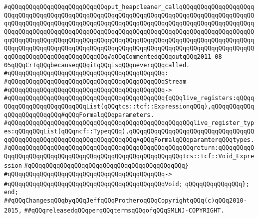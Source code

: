 \verb|#qQQqqQQqqQQqqQQqqQQqqQQqqQQqput_heapcleaner_callqQQqqQQqqQQqqQQqqQQqqQQqqQQqqQQqqQQqqQQqqQQqqQQqqQQqqQQqqQQqqQQqqQQqqQQqqQQqqQQqqQQqqQQqqQQqqQQqqQQqqQQqqQQqqQQqqQQqqQQqqQQqqQQqqQQqqQQqqQQqqQQqqQQqqQQqqQQqqQQqqQQqqQQqqQQqqQQqqQQqqQQqqQQqqQQqqQQqqQQqqQQqqQQqqQQqqQQqqQQqqQQqqQQqqQQqqQQqqQQqqQQqqQQqqQQqqQQqqQQqqQQqqQQqqQQqqQQqqQQqqQQqqQQqqQQqqQQqqQQqqQQqqQQqqQQqqQQqqQQqqQQqqQQqqQQqqQQqqQQqqQQqqQQqqQQqqQQqqQQqqQQqqQQqqQQqqQQqqQQqqQQqqQQqqQQqqQQqqQQq#qQQqCommentedqQQqoutqQQq2011-08-05qQQqCrTqQQqbecauseqQQqitqQQqisqQQqneverqQQqcalled.|\newline
\verb|#qQQqqQQqqQQqqQQqqQQqqQQqqQQqqQQqqQQqqQQqqQQq:|\newline
\verb|#qQQqqQQqqQQqqQQqqQQqqQQqqQQqqQQqqQQqqQQqqQQqStream|\newline
\verb|#qQQqqQQqqQQqqQQqqQQqqQQqqQQqqQQqqQQqqQQqqQQq->|\newline
\verb|#qQQqqQQqqQQqqQQqqQQqqQQqqQQqqQQqqQQqqQQqqQQq{qQQqlive_registers:qQQqqQQqqQQqqQQqqQQqqQQqqQQqList(qQQqtcs::tcf::ExpressionqQQq),qQQqqQQqqQQqqQQqqQQqqQQqqQQq#qQQqFormalqQQqparameters.|\newline
\verb|#qQQqqQQqqQQqqQQqqQQqqQQqqQQqqQQqqQQqqQQqqQQqqQQqqQQqlive_register_types:qQQqqQQqList(qQQqncf::TypeqQQq),qQQqqQQqqQQqqQQqqQQqqQQqqQQqqQQqqQQqqQQqqQQqqQQqqQQqqQQqqQQqqQQqqQQqqQQq#qQQqFormalqQQqparamterqQQqtypes.|\newline
\verb|#qQQqqQQqqQQqqQQqqQQqqQQqqQQqqQQqqQQqqQQqqQQqqQQqqQQqreturn:qQQqqQQqqQQqqQQqqQQqqQQqqQQqqQQqqQQqqQQqqQQqqQQqqQQqqQQqqQQqtcs::tcf::Void_Expression|\newline
\verb|#qQQqqQQqqQQqqQQqqQQqqQQqqQQqqQQqqQQqqQQqqQQq}|\newline
\verb|#qQQqqQQqqQQqqQQqqQQqqQQqqQQqqQQqqQQqqQQqqQQq->|\newline
\verb|#qQQqqQQqqQQqqQQqqQQqqQQqqQQqqQQqqQQqqQQqqQQqVoid;|\newline
\newline
\verb|qQQqqQQqqQQqqQQq};|\newline
\verb|end;|\newline
\newline
\verb|##qQQqChangesqQQqbyqQQqJeffqQQqProtheroqQQqCopyrightqQQq(c)qQQq2010-2015,|\newline
\verb|##qQQqreleasedqQQqperqQQqtermsqQQqofqQQqSMLNJ-COPYRIGHT.|\newline

